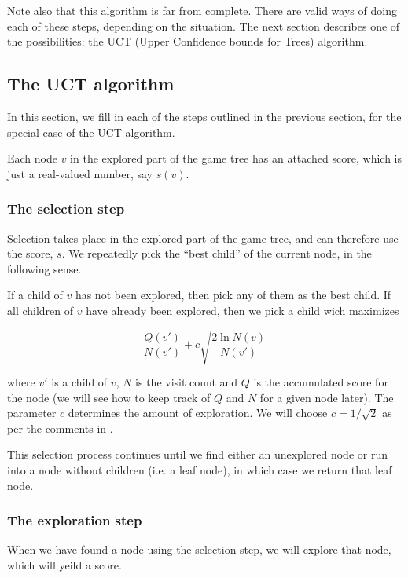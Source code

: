 Note also that this algorithm is far from complete. There are valid ways of doing each of these steps, depending on the situation.
The next section describes one of the possibilities: the UCT (Upper Confidence bounds for Trees) algorithm.


\subsection{The UCT algorithm}
\label{sec:uct}

In this section, we fill in each of the steps outlined in the previous section, for the special case of the UCT algorithm.


Each node $v$ in the explored part of the game tree has an attached score, which is just a real-valued number, say $s(v)$.


\subsubsection{The selection step}

Selection takes place in the explored part of the game tree, and can therefore use the score, $s$.
We repeatedly pick the ``best child'' of the current node, in the following sense.

If a child of $v$ has not been explored, then pick any of them as the best child.
If all children of $v$ have already been explored, then we pick a child wich maximizes

\begin{equation}
\label{eq:uctnodevalue}
\frac{Q(v')}{N(v')} + c\sqrt{\frac{2\ln{N(v)}}{N(v')}}
\end{equation} 


where $v'$ is a child of $v$, $N$ is the visit count and $Q$ is the accumulated score for the node (we will see how to keep track of $Q$ and $N$ for a given node later).
The parameter $c$ determines the amount of exploration. We will choose $c = 1 / \sqrt 2$ as per the comments in \citep[p. 9]{mcts_survey12}.

This selection process continues until we find either an unexplored node or run into a node without children (i.e. a leaf node), in which case we return that leaf node.

\subsubsection{The exploration step}

When we have found a node using the selection step, we will explore that node, which will yeild a score.

